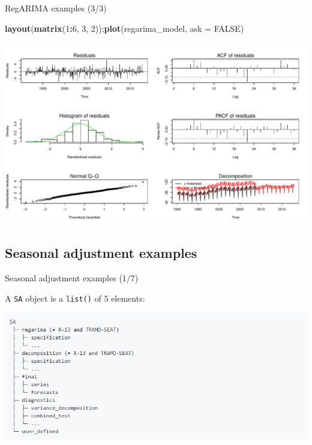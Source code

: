 \documentclass[10pt,xcolor=table,color={dvipsnames,usenames},ignorenonframetext,usepdftitle=false,french]{beamer}
\newenvironment{Shaded}{\begin{snugshade}}{\end{snugshade}}
\newcommand{\DataTypeTok}[1]{\textcolor[rgb]{0.13,0.29,0.53}{#1}}
\newcommand{\DecValTok}[1]{\textcolor[rgb]{0.00,0.00,0.81}{#1}}
\newcommand{\KeywordTok}[1]{\textcolor[rgb]{0.13,0.29,0.53}{\textbf{#1}}}
\newcommand{\NormalTok}[1]{#1}
\newcommand{\OperatorTok}[1]{\textcolor[rgb]{0.81,0.36,0.00}{\textbf{#1}}}
\newcommand{\OtherTok}[1]{\textcolor[rgb]{0.56,0.35,0.01}{#1}}
\begin{document}
\begin{frame}[fragile]{RegARIMA examples (3/3)}
\protect\hypertarget{regarima-examples-33}{}

\begin{Shaded}
\begin{Highlighting}[]
\KeywordTok{layout}\NormalTok{(}\KeywordTok{matrix}\NormalTok{(}\DecValTok{1}\OperatorTok{:}\DecValTok{6}\NormalTok{, }\DecValTok{3}\NormalTok{, }\DecValTok{2}\NormalTok{));}\KeywordTok{plot}\NormalTok{(regarima_model, }\DataTypeTok{ask =} \OtherTok{FALSE}\NormalTok{)}
\end{Highlighting}
\end{Shaded}

\includegraphics{img/markdown-unnamed-chunk-5-1.pdf}

\end{frame}

\hypertarget{seasonal-adjustment-examples}{%
\subsection{Seasonal adjustment
examples}\label{seasonal-adjustment-examples}}

\begin{frame}[fragile]{Seasonal adjustment examples (1/7)}
\protect\hypertarget{seasonal-adjustment-examples-17}{}

A \texttt{SA} object is a \texttt{list()} of 5 elements:

\includegraphics{img/sa_obj_struct.png}

\end{frame}
\end{document}
